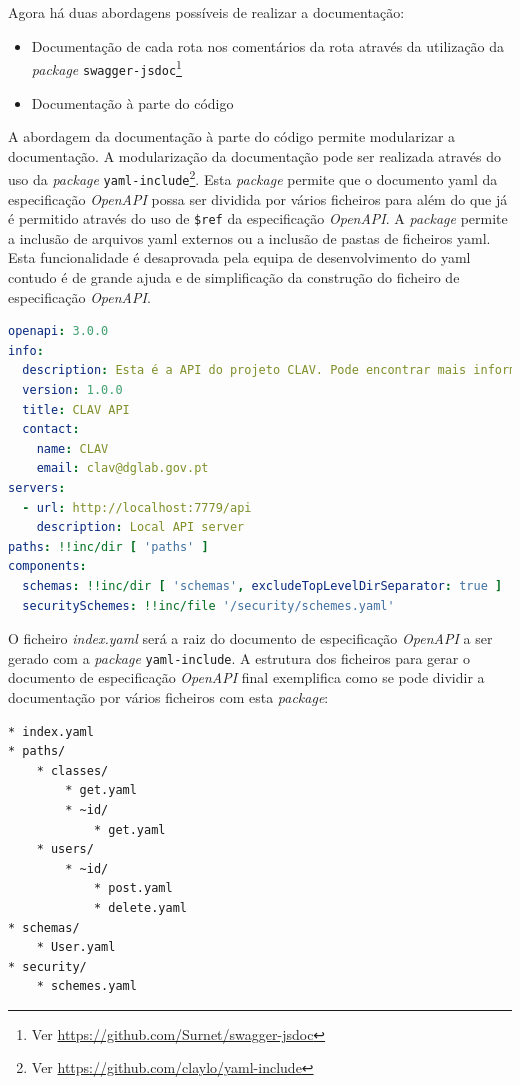 Agora há duas abordagens possíveis de realizar a documentação:
\begin{itemize}
    \item Documentação de cada rota nos comentários da rota através da utilização da \textit{package} \texttt{swagger-jsdoc}\footnote{Ver \url{https://github.com/Surnet/swagger-jsdoc}}
    \item Documentação à parte do código
\end{itemize}

A abordagem da documentação à parte do código permite modularizar a documentação. A modularização da documentação pode ser realizada através do uso da \textit{package} \texttt{yaml-include}\footnote{Ver \url{https://github.com/claylo/yaml-include}}. Esta \textit{package} permite que o documento \acrshort{yaml} da especificação \textit{OpenAPI} possa ser dividida por vários ficheiros para além do que já é permitido através do uso de \verb|$ref| da especificação \textit{OpenAPI}. A \textit{package} permite a inclusão de arquivos \acrshort{yaml} externos ou a inclusão de pastas de ficheiros \acrshort{yaml}. Esta funcionalidade é desaprovada pela equipa de desenvolvimento do \acrshort{yaml} contudo é de grande ajuda e de simplificação da construção do ficheiro de especificação \textit{OpenAPI}.

\begin{lstlisting}[language=yaml, caption=Exemplo de uso do \texttt{yaml-include} no documento de especificação \textit{OpenAPI}(\textit{index.yaml}), label=exem:yamli]
openapi: 3.0.0
info:
  description: Esta é a API do projeto CLAV. Pode encontrar mais informação sobre o CLAV em [http://clav.dglab.gov.pt](http://clav.dglab.gov.pt).
  version: 1.0.0
  title: CLAV API
  contact:
    name: CLAV
    email: clav@dglab.gov.pt
servers:
  - url: http://localhost:7779/api
    description: Local API server
paths: !!inc/dir [ 'paths' ]
components:
  schemas: !!inc/dir [ 'schemas', excludeTopLevelDirSeparator: true ]
  securitySchemes: !!inc/file '/security/schemes.yaml'
\end{lstlisting}

O ficheiro \textit{index.yaml} será a raiz do documento de especificação \textit{OpenAPI} a ser gerado com a \textit{package} \texttt{yaml-include}. A estrutura dos ficheiros para gerar o documento de especificação \textit{OpenAPI} final exemplifica como se pode dividir a documentação por vários ficheiros com esta \textit{package}:
\begin{lstlisting}[language=pseudocode, caption=Exemplo de estrutura dos ficheiros para gerar o documento de especificação \textit{OpenAPI}, label=exem:faf]
* index.yaml
* paths/
    * classes/
        * get.yaml
        * ~id/
            * get.yaml
    * users/
        * ~id/
            * post.yaml
            * delete.yaml
* schemas/
    * User.yaml
* security/
    * schemes.yaml
\end{lstlisting}

